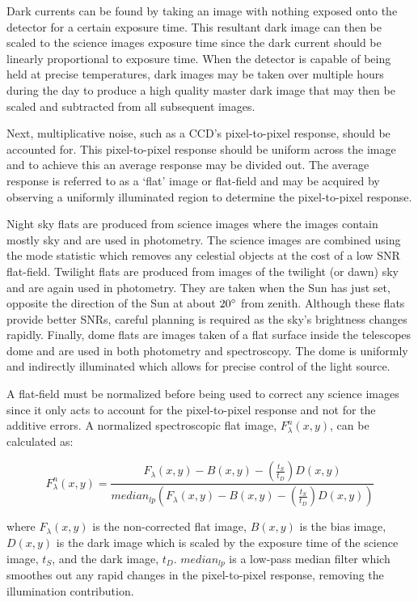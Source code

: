 Dark currents can be found by taking an image with nothing exposed onto the detector for a certain exposure time. This resultant dark image can then be scaled to the science images exposure time since the dark current should be linearly proportional to exposure time. When the detector is capable of being held at precise temperatures, dark images may be taken over multiple hours during the day to produce a high quality master dark image that may then be scaled and subtracted from all subsequent images.
\prgph

Next, multiplicative noise, such as a \gls{CCD}'s pixel-to-pixel response, should be accounted for. This pixel-to-pixel response should be uniform across the image and to achieve this an average response may be divided out. The average response is referred to as a `flat' image or flat-field and may be acquired by observing a uniformly illuminated region to determine the pixel-to-pixel response.
\prgph

Night sky flats are produced from science images where the images contain mostly sky and are used in photometry. The science images are combined using the mode statistic which removes any celestial objects at the cost of a low \gls{SNR} flat-field.
Twilight flats are produced from images of the twilight (or dawn) sky and are again used in photometry. They are taken when the Sun has just set, opposite the direction of the Sun at about $20\hbox{$^\circ$}$ from zenith. Although these flats provide better \glspl{SNR}, careful planning is required as the sky's brightness changes rapidly.
Finally, dome flats are images taken of a flat surface inside the telescopes dome and are used in both photometry and spectroscopy. The dome is uniformly and indirectly illuminated which allows for precise control of the light source.
\prgph

A flat-field must be normalized before being used to correct any science images since it only acts to account for the pixel-to-pixel response and not for the additive errors. A  normalized spectroscopic flat image, $F^{n}_{\lambda}(x,y)$, can be calculated as:

\begin{equation}
  F^{n}_{\lambda}(x,y) = \frac{F_{\lambda}(x,y) - B(x,y) - (\frac{t_{S}}{t_{D}})D(x,y)}{median_{lp}(F_{\lambda}(x,y) - B(x,y) - (\frac{t_{S}}{t_{D}})D(x,y))}
  \label{eq:norm_flat}
\end{equation}

\noindent where $F_{\lambda}(x,y)$ is the non-corrected flat image, $B(x,y)$ is the bias image, $D(x,y)$ is the dark image which is scaled by the exposure time of the science image, $t_{S}$, and the dark image, $t_{D}$. $median_{lp}$ is a low-pass median filter which smoothes out any rapid changes in the pixel-to-pixel response, removing the illumination contribution.
\prgph

